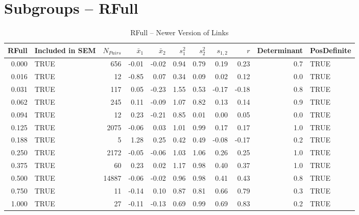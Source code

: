 \documentclass{article}\usepackage[]{graphicx}\usepackage[]{color}
\begin{document}
\section{Subgroups --  RFull }%
\begin{table}[ht]
\centering
\begin{tabular}{rlrrrrrrrrl}
  \hline
RFull & Included in SEM & $N_{Pairs}$ & $\bar{x}_1$ & $\bar{x}_2$ & $s_1^2$ & $s_2^2$ & $s_{1,2}$ & $r$ & Determinant & PosDefinite \\ 
  \hline
0.000 & TRUE & 656 & -0.01 & -0.02 & 0.94 & 0.79 & 0.19 & 0.23 & 0.7 & TRUE \\ 
  0.016 & TRUE & 12 & -0.85 & 0.07 & 0.34 & 0.09 & 0.02 & 0.12 & 0.0 & TRUE \\ 
  0.031 & TRUE & 117 & 0.05 & -0.23 & 1.55 & 0.53 & -0.17 & -0.18 & 0.8 & TRUE \\ 
  0.062 & TRUE & 245 & 0.11 & -0.09 & 1.07 & 0.82 & 0.13 & 0.14 & 0.9 & TRUE \\ 
  0.094 & TRUE & 12 & 0.23 & -0.21 & 0.85 & 0.01 & 0.00 & 0.05 & 0.0 & TRUE \\ 
  0.125 & TRUE & 2075 & -0.06 & 0.03 & 1.01 & 0.99 & 0.17 & 0.17 & 1.0 & TRUE \\ 
  0.188 & TRUE & 5 & 1.28 & 0.25 & 0.42 & 0.49 & -0.08 & -0.17 & 0.2 & TRUE \\ 
  0.250 & TRUE & 2172 & -0.05 & -0.06 & 1.03 & 1.06 & 0.26 & 0.25 & 1.0 & TRUE \\ 
  0.375 & TRUE & 60 & 0.23 & 0.02 & 1.17 & 0.98 & 0.40 & 0.37 & 1.0 & TRUE \\ 
  0.500 & TRUE & 14887 & -0.06 & -0.02 & 0.96 & 0.98 & 0.41 & 0.43 & 0.8 & TRUE \\ 
  0.750 & TRUE & 11 & -0.14 & 0.10 & 0.87 & 0.81 & 0.66 & 0.79 & 0.3 & TRUE \\ 
  1.000 & TRUE & 27 & -0.11 & -0.13 & 0.69 & 0.99 & 0.69 & 0.83 & 0.2 & TRUE \\ 
   \hline
\end{tabular}
\caption{RFull -- Newer Version of Links} 
\end{table}
\end{document}
